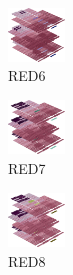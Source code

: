 \hspace{0.1cm}
\begin{minipage}[b]{0.15\linewidth}
\begin{figure}[H]                                                          
  \centering                                                             
  \begin{adjustbox}{width=1.5cm,center}                                   
  \includegraphics[width=1.5cm]{src/colorspace_colourflow/flows/colourflow_70-45.png}%
  \end{adjustbox}                                                        
\caption*{RED6}                                           
\end{figure}                                                               
\end{minipage}
\hspace{0.1cm}
\begin{minipage}[b]{0.15\linewidth}
\begin{figure}[H]                                                          
  \centering                                                             
  \begin{adjustbox}{width=1.5cm,center}                                   
  \includegraphics[width=1.5cm]{src/colorspace_colourflow/flows/colourflow_71-45.png}%
  \end{adjustbox}                                                        
\caption*{RED7}                                           
\end{figure}                                                               
\end{minipage}
\hspace{0.1cm}
\begin{minipage}[b]{0.15\linewidth}
\begin{figure}[H]                                                          
  \centering                                                             
  \begin{adjustbox}{width=1.5cm,center}                                   
  \includegraphics[width=1.5cm]{src/colorspace_colourflow/flows/colourflow_72-45.png}%
  \end{adjustbox}                                                        
\caption*{RED8}                                           
\end{figure}                                                               
\end{minipage}
